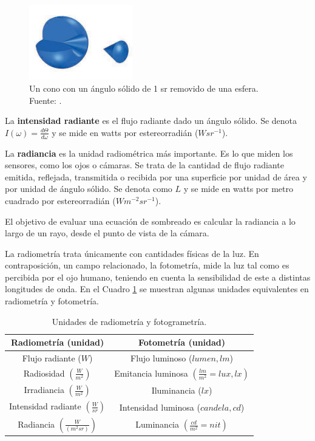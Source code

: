 \begin{figure}[ht]
    \centering
    \includegraphics[width=0.4\textwidth]{steradians.png}
    \caption{Un cono con un ángulo sólido de 1 sr removido de una esfera. Fuente: \cite{rtr}.}
    \label{fig:steradian}
\end{figure}

La \textbf{intensidad radiante} es el flujo radiante dado un ángulo sólido.
Se denota $I(\omega) = \frac{d\Theta}{d\omega}$ y se mide en watts por estereorradián ($W sr^{-1}$).

La \textbf{radiancia} es la unidad radiométrica más importante.
Es lo que miden los sensores, como los ojos o cámaras.
Se trata de la cantidad de flujo radiante emitida, reflejada, transmitida o recibida por una superficie por unidad de área y por unidad de ángulo sólido.
Se denota como $L$ y se mide en watts por metro cuadrado por estereorradián ($W m^{-2} sr^{-1}$).

El objetivo de evaluar una ecuación de sombreado es calcular la radiancia a lo largo de un rayo, desde el punto de vista de la cámara.

La radiometría trata únicamente con cantidades físicas de la luz.
En contraposición, un campo relacionado, la fotometría, mide la luz tal como es percibida por el ojo humano, teniendo en cuenta la sensibilidad de este a distintas longitudes de onda.
En el Cuadro \ref{table:light_units} se muestran algunas unidades equivalentes en radiometría y fotometría.

\begin{table}
\centering
\begin{tabular}{|c|c|}
    \hline
    \textbf{Radiometría (unidad)} & \textbf{Fotometría (unidad)} \\
    \hline
    Flujo radiante ($W$) & Flujo luminoso ($lumen, lm$) \\
    \hline
    Radiosidad $\left(\frac{W}{m^2}\right)$ & Emitancia luminosa $\left(\frac{lm}{m^2} = lux, lx\right)$ \\
    \hline
    Irradiancia $\left(\frac{W}{m^2}\right)$ & Iluminancia ($lx$) \\
    \hline
    Intensidad radiante $\left(\frac{W}{sr}\right)$ & Intensidad luminosa ($candela, cd$) \\
    \hline
    Radiancia $\left(\frac{W}{(m^2sr)}\right)$ & Luminancia $\left(\frac{cd}{m^2} = nit\right)$ \\
    \hline
\end{tabular}
\caption{Unidades de radiometría y fotogrametría.}
\label{table:light_units}
\end{table}

